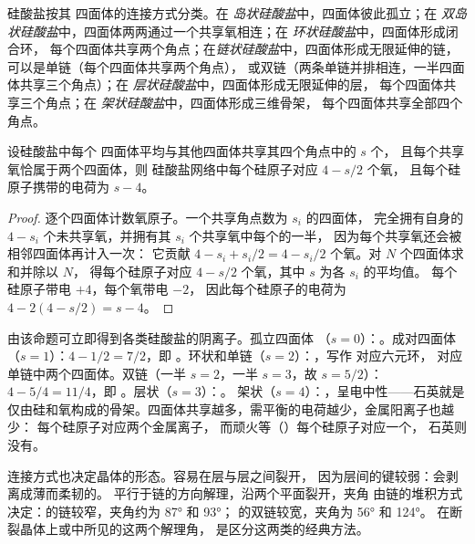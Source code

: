\begin{definition}[硅酸盐的分类]\label{def:b1:rock-forming-minerals:silicate-classes}
硅酸盐按其  四面体的连接方式分类。在
\emph{岛状硅酸盐}中，四面体彼此孤立；在
\emph{双岛状硅酸盐}中，四面体两两通过一个共享氧相连；在
\emph{环状硅酸盐}中，四面体形成闭合环，
每个四面体共享两个角点；在\emph{链状硅酸盐}中，四面体形成无限延伸的链，
可以是单链（每个四面体共享两个角点），
或双链（两条单链并排相连，一半四面体共享三个角点）；在
\emph{层状硅酸盐}中，四面体形成无限延伸的层，
每个四面体共享三个角点；在
\emph{架状硅酸盐}中，四面体形成三维骨架，
每个四面体共享全部四个角点。
\end{definition}

\begin{proposition}[硅氧比]\label{prop:b1:rock-forming-minerals:si-o}
设硅酸盐中每个  四面体平均与其他四面体共享其四个角点中的 $s$ 个，
且每个共享氧恰属于两个四面体，则
硅酸盐网络中每个硅原子对应 $4 - s/2$ 个氧，
且每个硅原子携带的电荷为 $s - 4$。
\end{proposition}

\begin{proof}
逐个四面体计数氧原子。一个共享角点数为 $s_i$ 的四面体，
完全拥有自身的 $4 - s_i$ 个未共享氧，并拥有其 $s_i$ 个共享氧中每个的一半，
因为每个共享氧还会被相邻四面体再计入一次：
它贡献 $4 - s_i + s_i/2 = 4 - s_i/2$ 个氧。对 $N$ 个四面体求和并除以 $N$，
得每个硅原子对应 $4 - s/2$ 个氧，其中 $s$ 为各 $s_i$ 的平均值。
每个硅原子带电 $+4$，每个氧带电 $-2$，
因此每个硅原子的电荷为 $4 - 2(4 - s/2) = s - 4$。
\end{proof}

由该命题可立即得到各类硅酸盐的阴离子。孤立四面体
（$s = 0$）：。成对四面体（$s = 1$）：$4 - 1/2 = 7/2$，即
。环状和单链（$s = 2$）：，写作
 对应六元环， 对应
单链中两个四面体。双链（一半 $s = 2$，一半 $s = 3$，故 $s = 5/2$）：
$4 - 5/4 = 11/4$，即 。层状（$s = 3$）：。
架状（$s = 4$）：，呈电中性——石英就是
仅由硅和氧构成的骨架。四面体共享越多，需平衡的电荷越少，金属阳离子也越少：
  每个硅原子对应两个金属离子，
而顽火等（）每个硅原子对应一个，
石英则没有。

连接方式也决定晶体的形态。容易在层与层之间裂开，
因为层间的键较弱：会剥离成薄而柔韧的。
平行于链的方向解理，沿两个平面裂开，夹角
由链的堆积方式决定：的链较窄，夹角约为 \ang{87} 和 \ang{93}；
的双链较宽，夹角为 \ang{56} 和 \ang{124}。
在断裂晶体上或中所见的这两个解理角，
是区分这两类的经典方法。

